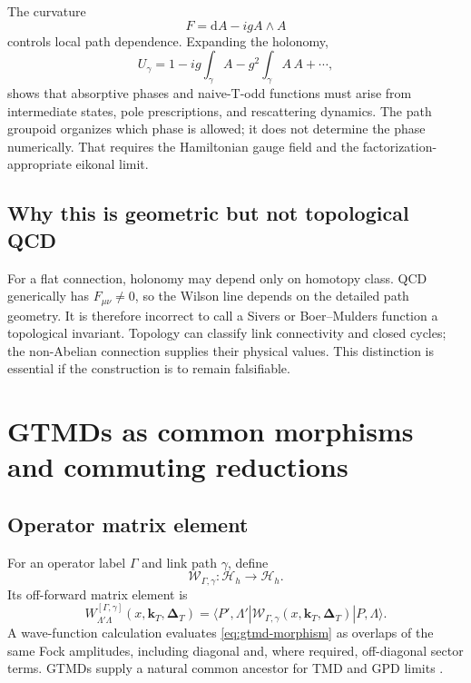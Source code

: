 \documentclass[11pt]{article}
\newcommand{\kT}{\bm{k}_{T}}
\newcommand{\DT}{\bm{\Delta}_{T}}
\newcommand{\dd}{\mathrm{d}}
\newcommand{\Hil}{\mathcal H}
\begin{document}
The curvature
\begin{equation}
F=\dd A-igA\wedge A
\label{eq:curvature}
\end{equation}
controls local path dependence.  Expanding the holonomy,
\begin{equation}
U_\gamma
=1-ig\int_\gamma A
-g^2\int_{\gamma}A\,A+\cdots ,
\label{eq:holonomy-expansion}
\end{equation}
shows that absorptive phases and naive-T-odd functions must arise from
intermediate states, pole prescriptions, and rescattering dynamics.  The
path groupoid organizes which phase is allowed; it does not determine the
phase numerically.  That requires the Hamiltonian gauge field and the
factorization-appropriate eikonal limit.

\subsection{Why this is geometric but not topological QCD}

For a flat connection, holonomy may depend only on homotopy class.  QCD
generically has \(F_{\mu\nu}\ne0\), so the Wilson line depends on the detailed
path geometry.  It is therefore incorrect to call a Sivers or
Boer--Mulders function a topological invariant.  Topology can classify link
connectivity and closed cycles; the non-Abelian connection supplies their
physical values.  This distinction is essential if the construction is to
remain falsifiable.

\section{GTMDs as common morphisms and commuting reductions}

\subsection{Operator matrix element}

For an operator label \(\Gamma\) and link path \(\gamma\), define
\begin{equation}
\mathcal W_{\Gamma,\gamma}:\Hil_h\longrightarrow\Hil_h.
\end{equation}
Its off-forward matrix element is
\begin{equation}
W_{\Lambda'\Lambda}^{[\Gamma,\gamma]}
(x,\kT,\DT)
=
\langle P',\Lambda'|
\mathcal W_{\Gamma,\gamma}(x,\kT,\DT)
|P,\Lambda\rangle .
\label{eq:gtmd-morphism}
\end{equation}
A wave-function calculation evaluates \cref{eq:gtmd-morphism} as overlaps of
the same Fock amplitudes, including diagonal and, where required,
off-diagonal sector terms.  GTMDs supply a natural common ancestor for TMD
and GPD limits \cite{Meissner2008}.
\end{document}
